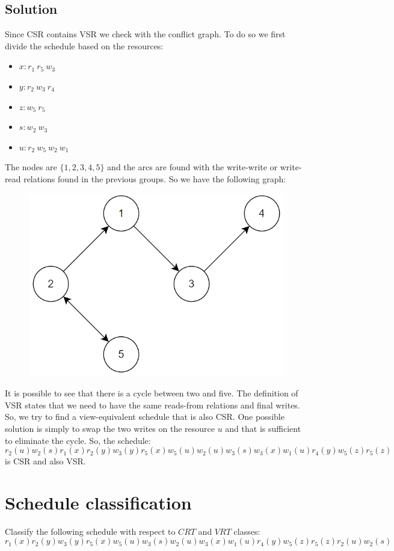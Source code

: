 \documentclass[12pt, a4paper]{report}
\newtheorem[style=M,bodystyle=\normalfont]{theorem}{Theorem}
\newtheorem[style=M,bodystyle=\normalfont]{corollary}{Corollary}
\newtheorem[style=M,bodystyle=\normalfont]{lemma}{Lemma}
\newtheorem[style=M,bodystyle=\normalfont]{definition}{Definition}
\begin{document}
    \subsection*{Solution}
        Since CSR contains VSR we check with the conflict graph. To do so we first divide the schedule based on the resources: 
        \begin{itemize}
            \item $x: r_1 \: r_5 \:w_3$
            \item $y: r_2 \: w_3 \:r_4$
            \item $z: w_5 \: r_5$
            \item $s: w_2 \: w_3$
            \item $u: r_2 \: w_5 \: w_2 \:w_1$
        \end{itemize}
        The nodes are $\{1,2,3,4,5\}$ and the arcs are found with the write-write or write-read relations found in the previous groups. So we have the following graph:
        \begin{figure}[H]
            \centering
            \includegraphics[width=0.5\linewidth]{images/conflictgraph1.png}
        \end{figure}
        It is possible to see that there is a cycle between two and five. The definition of VSR states that we need to have the same reads-from relations and final writes. So, we try to find a view-equivalent 
        schedule that is also CSR. One possible solution is simply to swap the two writes on the resource $u$ and that is sufficient to eliminate the cycle. So, the schedule: 
        \[r_2(u) w_2(s) r_1(x) r_2(y) w_3(y) r_5(x) w_5(u) w_2(u) w_3(s) w_3(x) w_1(u) r_4(y) w_5(z) r_5(z)\]
        is CSR and also VSR. 

    \newpage
    
    \section{Schedule classification}
        Classify the following schedule with respect to $CRT$ and $VRT$ classes: 
        \[r_1(x) r_2(y) w_3(y) r_5(x) w_5(u) w_3(s)w_2(u) w_3(x) w_1(u) r_4(y) w_5(z) r_5(z) r_2(u) w_2(s)\]
\end{document}
